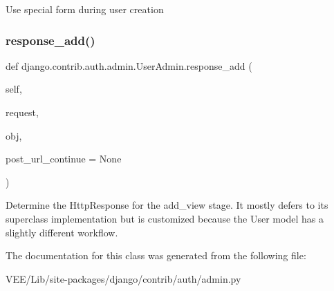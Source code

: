 \begin{DoxyVerb}Use special form during user creation
\end{DoxyVerb}
 \mbox{\label{classdjango_1_1contrib_1_1auth_1_1admin_1_1_user_admin_ab68356aa10e52a94f8ab03590b6c3b40}} 
\subsubsection{\texorpdfstring{response\+\_\+add()}{response\_add()}}
{\footnotesize\ttfamily def django.\+contrib.\+auth.\+admin.\+User\+Admin.\+response\+\_\+add (\begin{DoxyParamCaption}\item[{}]{self,  }\item[{}]{request,  }\item[{}]{obj,  }\item[{}]{post\+\_\+url\+\_\+continue = {\ttfamily None} }\end{DoxyParamCaption})}

\begin{DoxyVerb}Determine the HttpResponse for the add_view stage. It mostly defers to
its superclass implementation but is customized because the User model
has a slightly different workflow.
\end{DoxyVerb}
 

The documentation for this class was generated from the following file\+:\begin{DoxyCompactItemize}
\item 
V\+E\+E/\+Lib/site-\/packages/django/contrib/auth/admin.\+py\end{DoxyCompactItemize}

